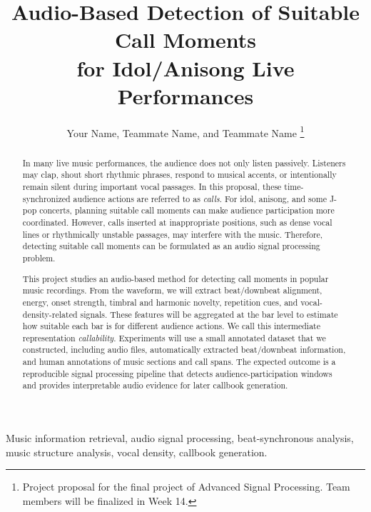 \documentclass[lettersize,journal]{IEEEtran}
\begin{document}
\title{Audio-Based Detection of Suitable Call Moments\\
for Idol/Anisong Live Performances}

\author{Your Name, Teammate Name, and Teammate Name%
\thanks{Project proposal for the final project of Advanced Signal Processing. Team members will be finalized in Week 14.}}


\maketitle

\begin{abstract}
In many live music performances, the audience does not only listen passively. Listeners may clap, shout short rhythmic phrases, respond to musical accents, or intentionally remain silent during important vocal passages. In this proposal, these time-synchronized audience actions are referred to as \emph{calls}. For idol, anisong, and some J-pop concerts, planning suitable call moments can make audience participation more coordinated. However, calls inserted at inappropriate positions, such as dense vocal lines or rhythmically unstable passages, may interfere with the music. Therefore, detecting suitable call moments can be formulated as an audio signal processing problem.

This project studies an audio-based method for detecting call moments in popular music recordings. From the waveform, we will extract beat/downbeat alignment, energy, onset strength, timbral and harmonic novelty, repetition cues, and vocal-density-related signals. These features will be aggregated at the bar level to estimate how suitable each bar is for different audience actions. We call this intermediate representation \emph{callability}. Experiments will use a small annotated dataset that we constructed, including audio files, automatically extracted beat/downbeat information, and human annotations of music sections and call spans. The expected outcome is a reproducible signal processing pipeline that detects audience-participation windows and provides interpretable audio evidence for later callbook generation.
\end{abstract}

\begin{IEEEkeywords}
Music information retrieval, audio signal processing, beat-synchronous analysis, music structure analysis, vocal density, callbook generation.
\end{IEEEkeywords}
\end{document}
